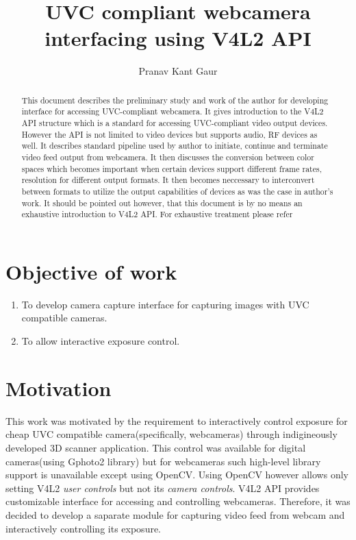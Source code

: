 \documentclass{article}
\begin{document}
\title{UVC compliant webcamera interfacing using V4L2 API}
\author{Pranav Kant Gaur}
\maketitle

\begin{abstract}
This document describes the preliminary study and work of the author for developing interface for accessing UVC-compliant webcamera. It gives introduction to the V4L2 API structure which is a standard for accessing UVC-compliant video output devices. However the API is not limited to video devices but supports audio, RF devices as well. It describes standard pipeline used by author to initiate, continue and terminate video feed output from webcamera. It then discusses the conversion between color spaces which becomes important when certain devices support different frame rates, resolution for different output formats. It then becomes neccessary to interconvert between formats to utilize the output capabilities of devices as was the case in author's work. It should be pointed out however, that this document is by no means an exhaustive introduction to V4L2 API. For exhaustive treatment please refer\cite{V4L2 specification}

\end{abstract}


\section{Objective of work}
\begin{enumerate}
\item To develop camera capture interface for capturing images with UVC compatible cameras.
\item To allow interactive exposure control.
\end{enumerate}

\section{Motivation}
This work was motivated by the requirement to interactively control exposure for cheap UVC compatible camera(specifically, webcameras) through indigineously developed 3D scanner application\cite{our IEEE paper}. This control was available for digital cameras(using Gphoto2 library\cite{gphoto2}) but for webcameras such high-level library support is unavailable except using OpenCV. Using OpenCV however allows only setting V4L2 \textit{user controls} but not its \textit{camera controls}. V4L2 API\cite{v4l2_spec} provides customizable interface for accessing and controlling webcameras. Therefore, it was decided to develop a saparate module for capturing video feed from webcam and interactively controlling its exposure.
\end{document}

